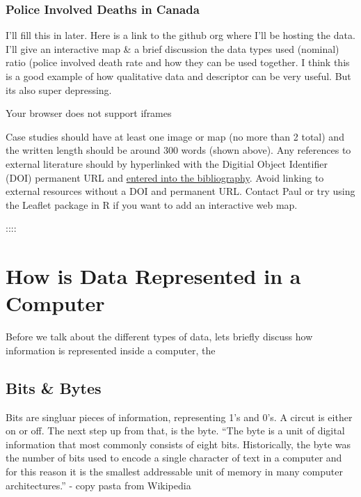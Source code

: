 \documentclass[
]{book}
\begin{document}
\hypertarget{box-text}{%
\subsubsection*{Police Involved Deaths in Canada}\label{box-text}}

I'll fill this in later. Here is a link to the github org where I'll be hosting the data. I'll give an interactive map \& a brief discussion the data types used (nominal) ratio (police involved death rate and how they can be used together. I think this is a good example of how qualitative data and descriptor can be very useful. But its also super depressing.

Your browser does not support iframes

Case studies should have at least one image or map (no more than 2 total) and the written length should be around 300 words (shown above). Any references to external literature should by hyperlinked with the Digitial Object Identifier (DOI) permanent URL and \href{https://bookdown.org/yihui/bookdown/citations.html}{entered into the bibliography}. Avoid linking to external resources without a DOI and permanent URL. Contact Paul or try using the Leaflet package in R if you want to add an interactive web map.

::::

\hypertarget{how-is-data-represented-in-a-computer}{%
\section{How is Data Represented in a Computer}\label{how-is-data-represented-in-a-computer}}

Before we talk about the different types of data, lets briefly discuss how information is represented inside a computer, the

\hypertarget{bits-bytes}{%
\subsection{Bits \& Bytes}\label{bits-bytes}}

Bits are singluar pieces of information, representing 1's and 0's. A circut is either on or off. The next step up from that, is the byte. ``The byte is a unit of digital information that most commonly consists of eight bits. Historically, the byte was the number of bits used to encode a single character of text in a computer and for this reason it is the smallest addressable unit of memory in many computer architectures.'' - copy pasta from Wikipedia
\end{document}
